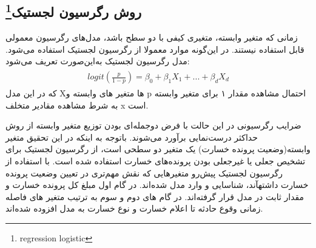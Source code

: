 \documentclass[paper=a4, fontsize=11pt]{article}
\numberwithin{equation}{section} %
\numberwithin{figure}{section} %
\numberwithin{table}{section} %
\begin{document}
\subsection{روش رگرسیون لجستیک\protect\footnote{regression logistic}}
زمانی که متغیر وابسته، متغیری کیفی با دو سطح باشد، مدل‌های رگرسیون معمولی قابل استفاده نیستند. در این‌گونه موارد معمولا از رگرسیون لجستیک استفاده می‌شود. مدل رگرسیون لجستیک به‌این‌صورت تعریف می‌شود:
\begin{align}
\begin{split}
    logit(\frac{p}{1-p}) = \beta_{0} + \beta_{1}X_{1} + ... + \beta_{d}X_{d} 
\end{split}
\end{align}
که در این مدل  X‌ها متغیر های وابسته و p احتمال مشاهده مقدار ۱ برای متغیر وابسته به شرط مشاهده مقادیر متخلف x است.
\par
ضرایب رگرسیونی در این حالت با فرض دوجمله‌ای بودن توزیع متغیر وابسته از روش حداکثر درست‌نمایی برآورد می‌شوند. باتوجه به اینکه در این تحقیق متغیر وابسته(وضعیت پرونده خسارت) یک متغیر دو سطحی است، از رگرسیون لجستیک برای تشخیص جعلی یا غیرجعلی بودن پرونده‌های خسارت استفاده شده است. با استفاده از رگرسیون لجستیک پیش‌رو متغیر‌هایی که نقش مهم‌تری در تعیین وضعیت پرونده خسارت داشتهآند، شناسایی و وارد مدل شده‌اند. در گام اول مبلغ کل پرونده خسارت و مقدار ثابت در مدل قرار گرفته‌اند. در گام های دوم و سوم به ترتیب متغیر های فاصله زمانی وقوع حادثه تا اعلام خسارت و نوع خسارت به مدل افزوده شده‌اند.
\end{document}

